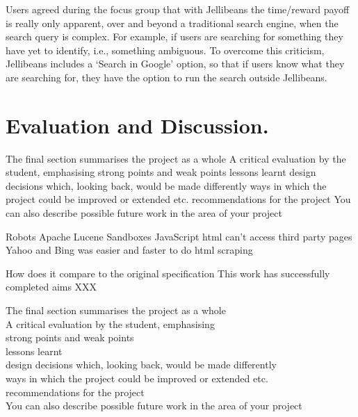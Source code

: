 \documentclass[a4paper, 11pt]{article}
\begin{document}
Users agreed during the focus group that with Jellibeans the time/reward payoff is really only apparent, over and beyond a traditional search engine, when the search query is complex. For example, if users are searching for something they have yet to identify, i.e., something ambiguous. To overcome this criticism, Jellibeans includes a `Search in Google' option, so that if users know what they are searching for, they have the option to run the search outside Jellibeans.

\section{Evaluation and Discussion.}\label{eval}


The final section summarises the project as a whole
A critical evaluation by the student, emphasising
strong points and weak points
lessons learnt
design decisions which, looking back, would be made differently
ways in which the project could be improved or extended etc.
recommendations for the project
You can also describe possible future work in the area of your project




Robots
Apache Lucene
Sandboxes
JavaScript html can't access third party pages
Yahoo and Bing was easier and faster to do html scraping


How does it compare to the original specification
This work has successfully completed aims XXX

The final section summarises the project as a whole\\
A critical evaluation by the student, emphasising\\
strong points and weak points\\
lessons learnt\\
design decisions which, looking back, would be made differently\\
ways in which the project could be improved or extended etc.\\
recommendations for the project\\
You can also describe possible future work in the area of your project
\end{document}
